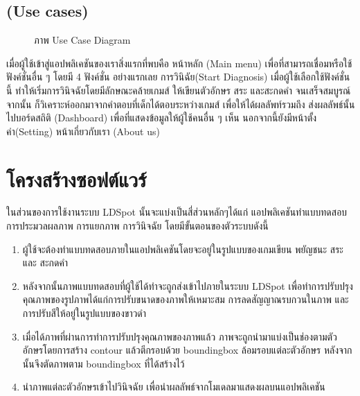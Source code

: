 \documentclass[12pt,oneside,openright,a4paper]{cpe-thai-project}
\begin{document}
\subsection{(Use cases)}
\begin{figure}[!ht]\centering
  \setlength{\fboxrule}{0.2mm} %
  \setlength{\fboxsep}{1cm}
  \caption{ภาพ Use Case Diagram}\label{fig:usecase}
\end{figure}
เมื่อผู้ใช้เข้าสู่แอปพลิเคชันของเราสิ่งแรกที่พบคือ หน้าหลัก (Main menu) เพื่อที่สามารถเชื่อมหรือใช้ฟังค์ชั่นอื่น ๆ โดยมี 4 ฟังค์ชั่น อย่างแรกเลย 
การวินิฉัย(Start Diagnosis) เมื่อผู้ใช้เลือกใช้ฟังค์ชั่นนี้ ทำให้เริ่มการวินิจฉัยโดยมีลักษณะคล้ายเกมส์ ให้เขียนตัวอักษร สระ และสะกดคำ จนเสร็จสมบูรณ์จากนั้น ก็วิเคราะห์ออกมาจากคำตอบที่เด็กได้ตอบระหว่างเกมส์ 
เพื่อให้ได้ผลลัพท์รวมถึง ส่งผลลัพธ์นั้นไปบอร์ดสถิติ (Dashboard) เพื่อที่แสดงข้อมูลให้ผู้ใช้คนอื่น ๆ เห็น นอกจากนี้ยังมีหน้าตั้งค่า(Setting) หน้าเกี่ยวกับเรา (About us) 

\section{โครงสร้างซอฟต์แวร์}
ในส่วนของการใช้งานระบบ LDSpot นั้นจะแบ่งเป็นสี่ส่วนหลักๆได้แก่ แอปพลิเคชันทำแบบทดสอบ การประมวลผลภาพ การแยกภาพ การวินิจฉัย โดยมีขั้นตอนของตัวระบบดังนี้
\begin{enumerate}
  \item ผู้ใช้จะต้องทำแบบทดสอบภายในแอปพลิเคชันโดยจะอยู่ในรูปแบบของเกมเขียน พยัญชนะ สระ และ สะกดคำ
  \item หลังจากนั้นภาพแบบทดสอบที่ผู้ใช้ได้ทำจะถูกส่งเข้าไปภายในระบบ LDSpot เพื่อทำการปรับปรุงคุณภาพของรูปภาพได้แก่การปรับขนาดของภาพให้เหมาะสม การลดสัญญาณรบกวนในภาพ และการปรับสีให้อยู่ในรูปแบบของขาวดำ
  \item เมื่อได้ภาพที่ผ่านการทำการปรับปรุงคุณภาพของภาพแล้ว ภาพจะถูกนำมาแบ่งเป็นช่องตามตัวอักษรโดยการสร้าง contour แล้วตีกรอบด้วย boundingbox ล้อมรอบแต่ละตัวอักษร หลังจากนั้นจึงตัดภาพตาม boundingbox ที่ได้สร้างไว้
  \item นำภาพแต่ละตัวอักษรเข้าไปวินิจฉัย เพื่อนำผลลัพธ์จากโมเดลมาแสดงผลบนแอปพลิเคชัน
\end{enumerate}
\end{document}
